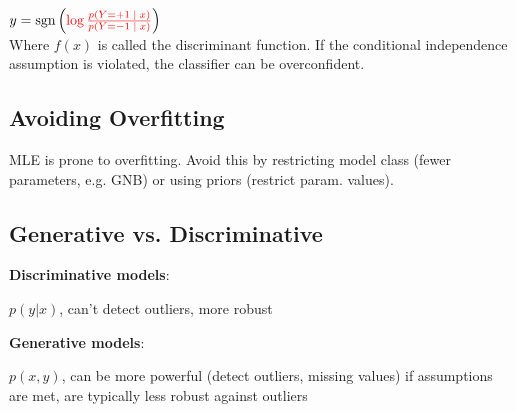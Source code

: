 \qquad \qquad $y = \text{sgn} \left( \color{red} \log \frac{p(Y = +1 \; | \; x)}{p(Y = -1 \; | \; x)} \color{black} \right)$ \\[-3pt]

Where \color{red}$f(x)$\color{black} is called the discriminant function. If the conditional independence assumption is violated, the classifier can be overconfident.

\subsection*{Avoiding Overfitting}

MLE is prone to overfitting. Avoid this by restricting model class (fewer parameters, e.g. GNB) or using priors (restrict param. values).

\subsection*{Generative vs. Discriminative}

\textbf{Discriminative models}:

$p(y | x)$, can't detect outliers, more robust

\textbf{Generative models}:

$p(x,y)$, can be more powerful (detect outliers, missing values) if assumptions are met, are typically less robust against outliers





